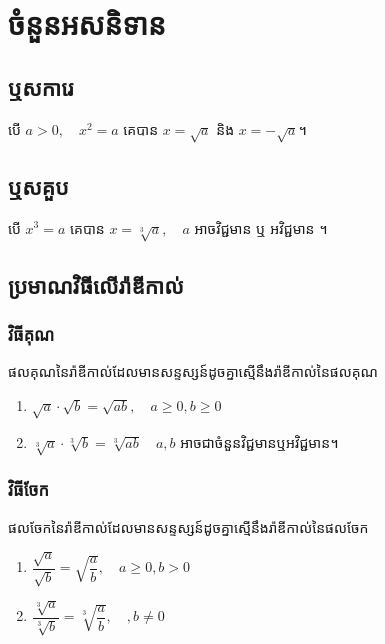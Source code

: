 \chapter{ចំនួនអសនិទាន}
\section{ឬសការេ}
\begin{generality}
បើ $a>0,\quad x^2=a$ គេបាន $x=\sqrt{a}$ និង  $x=-\sqrt{a}$។
\end{generality}

\section{ឬសគួប}
\begin{generality}
បើ $ x^3=a$ គេបាន $x=\sqrt[3]{a},\quad a$ អាចវិជ្ជមាន ឬ អវិជ្ជមាន ។
\end{generality}

\section{ប្រមាណវិធីលើរ៉ាឌីកាល់}
\subsection{វិធីគុណ}
\begin{generality}
ផលគុណនៃរ៉ាឌីកាល់ដែលមានសន្ទស្សន៍ដូចគ្នាស្មើនឹងរ៉ាឌីកាល់នៃផលគុណ
\begin{enumerate}[label=\alph*.]
	\item $\sqrt{a}\cdot \sqrt{b}=\sqrt{ab},\quad a\ge 0,b\ge 0$
	\item $\sqrt[3]{a}\cdot \sqrt[3]{b}=\sqrt[3]{ab}\quad a,b$ អាចជាចំនួនវិជ្ជមានឬអវិជ្ជមាន។
\end{enumerate}
\end{generality}
\subsection{វិធីចែក}
\begin{generality}
ផលចែកនៃរ៉ាឌីកាល់ដែលមានសន្ទស្សន៍ដូចគ្នាស្មើនឹងរ៉ាឌីកាល់នៃផលចែក
\begin{enumerate}[label=\alph*.]
	\item $\dfrac{\sqrt{a}}{\sqrt{b}}=\sqrt{\dfrac{a}{b}},\quad a\ge 0,b> 0$
	\item $\dfrac{\sqrt[3]{a}}{\sqrt[3]{b}}=\sqrt[3]{\dfrac{a}{b}},\quad ,b\ne 0$
\end{enumerate}
\end{generality}
